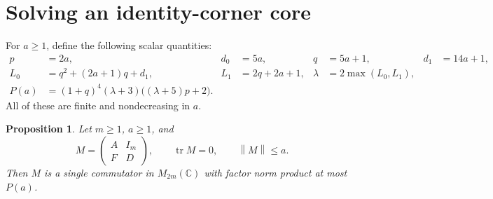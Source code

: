 \documentclass[11pt]{article}
\newtheorem{proposition}[theorem]{Proposition}
\theoremstyle{remark}
\newcommand{\C}{\mathbb C}
\newcommand{\tr}{\operatorname{tr}}
\newcommand{\norm}[1]{\left\lVert#1\right\rVert}
\numberwithin{equation}{section}
\begin{document}
\section{Solving an identity-corner core}\label{sec:riccati}
For $a\ge1$, define the following scalar quantities:
\begin{equation}\label{eq:P}
\begin{aligned}
 p&=2a,& d_0&=5a,& q&=5a+1,& d_1&=14a+1,\\
 L_0&=q^2+(2a+1)q+d_1,& L_1&=2q+2a+1,&
 \lambda&=2\max(L_0,L_1),\\[-2pt]
 P(a)&=(1+q)^4(\lambda+3)\bigl((\lambda+5)p+2\bigr).
\end{aligned}
\end{equation}
All of these are finite and nondecreasing in $a$.

\begin{proposition}\label{prop:core}
Let $m\ge1$, $a\ge1$, and
\[
 M=\begin{pmatrix}A&I_m\\F&D\end{pmatrix},\qquad
 \tr M=0,\qquad \norm M\le a.
\]
Then $M$ is a single commutator in $M_{2m}(\C)$ with factor norm product at most
$P(a)$.
\end{proposition}
\end{document}
